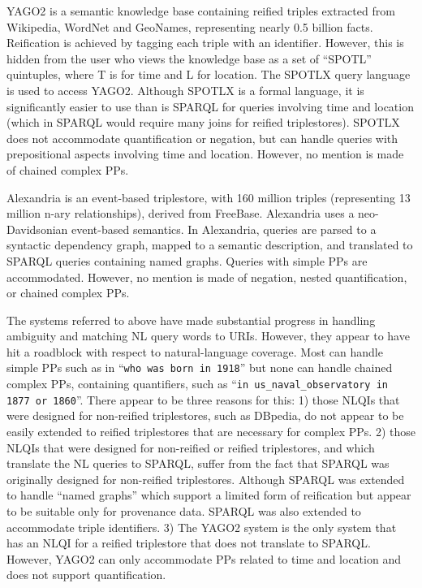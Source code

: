 \documentclass[../main.tex]{subfiles}
\begin{document}
\begin{refsection}
YAGO2 \cite{hoffart2013yago2} is a semantic knowledge base containing reified triples extracted from Wikipedia, WordNet and GeoNames, representing nearly 0.5 billion facts. Reification is achieved by tagging each triple with an identifier. However, this is hidden from the user who views the knowledge base as a set of ``SPOTL'' quintuples, where T is for time and L for location. The SPOTLX query language is used to access YAGO2. Although SPOTLX is a formal language, it is significantly easier to use than is SPARQL for queries involving time and location (which in SPARQL would require many joins for reified triplestores). SPOTLX does not accommodate quantification or negation, but can handle queries with prepositional aspects involving time and location. However, no mention is made of chained complex PPs.

Alexandria \cite{wendt2012linguistic} is an event-based triplestore, with 160 million triples (representing 13 million n-ary relationships), derived from FreeBase. Alexandria uses a neo-Davidsonian \cite{parsons1990events} event-based semantics. In Alexandria, queries are parsed to a syntactic dependency graph, mapped to a semantic description, and translated to SPARQL queries containing named graphs. Queries with simple PPs are accommodated. However, no mention is made of negation, nested quantification, or chained complex PPs.

The systems referred to above have made substantial progress in handling ambiguity and matching NL query words to URIs. However, they appear to have hit a roadblock with respect to natural-language coverage. Most can handle simple PPs such as in ``\texttt{who was born in 1918}'' but none can handle chained complex PPs, containing quantifiers, such as ``\texttt{in us\_naval\_observatory in 1877 or 1860}''. There appear to be three reasons for this: 1) those NLQIs that were designed for non-reified triplestores, such as DBpedia, do not appear to be easily extended to reified triplestores that are necessary for complex PPs. 2) those NLQIs that were designed for non-reified or reified triplestores, and which translate the NL queries to SPARQL, suffer from the fact that SPARQL was originally designed for non-reified triplestores.  Although SPARQL was extended to handle ``named graphs'' \cite{carroll2005named} which support a limited form of reification but appear to be suitable only for provenance data. SPARQL was also extended to accommodate triple identifiers. 3) The YAGO2 system is the only system that has an NLQI for a reified triplestore that does not translate to SPARQL. However, YAGO2 can only accommodate PPs related to time and location and does not support quantification.


\end{refsection}
\end{document}
